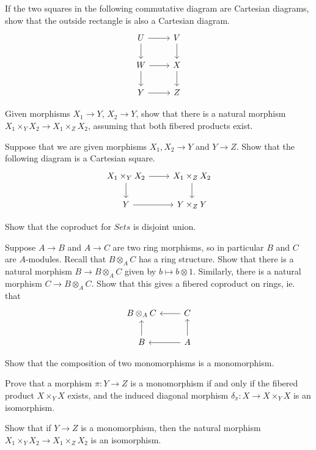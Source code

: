 \begin{exercise}
    If the two squares in the following commutative diagram are Cartesian diagrams, show that the outside rectangle is also a Cartesian diagram. 
    \[ \begin{tikzcd}
        U \arrow[r] \arrow[d] & V \arrow[d] \\ 
        W \arrow[r] \arrow[d] & X \arrow[d] \\ 
        Y \arrow[r] & Z 
    \end{tikzcd} \] 
\end{exercise}

\begin{exercise}
    Given morphisms $X_1 \to Y$, $X_2 \to Y$, show that there is a natural morphism $X_1 \times_Y X_2 \to X_1 \times_Z X_2$, assuming that both fibered products exist.
\end{exercise}

\begin{exercise}
    Suppose that we are given morphisms $X_1, X_2 \to Y$ and $Y \to Z$. Show that the following diagram is a Cartesian square. 
    \[ \begin{tikzcd}
        X_1 \times_Y X_2 \arrow[r] \arrow[d] & X_1 \times_Z X_2 \arrow[d] \\ 
        Y \arrow[r] & Y \times_Z Y 
    \end{tikzcd} \]
\end{exercise}

\begin{exercise}
    Show that the coproduct for $Sets$ is disjoint union. 
\end{exercise}

\begin{exercise}
    Suppose $A \to B$ and $A \to C$ are two ring morphisms, so in particular $B$ and $C$ are $A$-modules. Recall that $B \otimes_A C$ has a ring structure. Show that there is a natural morphism $B \to B \otimes_A C$ given by $b \mapsto b \otimes 1$. Similarly, there is a natural morphism $C \to B \otimes_A C$. Show that this gives a fibered coproduct on rings, ie. that 
    \[ \begin{tikzcd}
        B \otimes_A C & C \arrow[l] \\ 
        B \arrow[u] & A \arrow[u] \arrow[l]
    \end{tikzcd} \]
\end{exercise}

\begin{exercise}
    Show that the composition of two monomorphisms is a monomorphism. 
\end{exercise}

\begin{exercise}
    Prove that a morphism $\pi: Y \to Z$ is a monomorphism if and only if the fibered product $X \times_Y X$ exists, and the induced diagonal morphism $\delta_\pi: X \to X \times_Y X$ is an isomorphism. 
\end{exercise}

\begin{exercise}
    Show that if $Y \to Z$ is a monomorphism, then the natural morphism $X_1 \times_Y X_2 \to X_1 \times_Z X_2$ is an isomorphism. 
\end{exercise}

